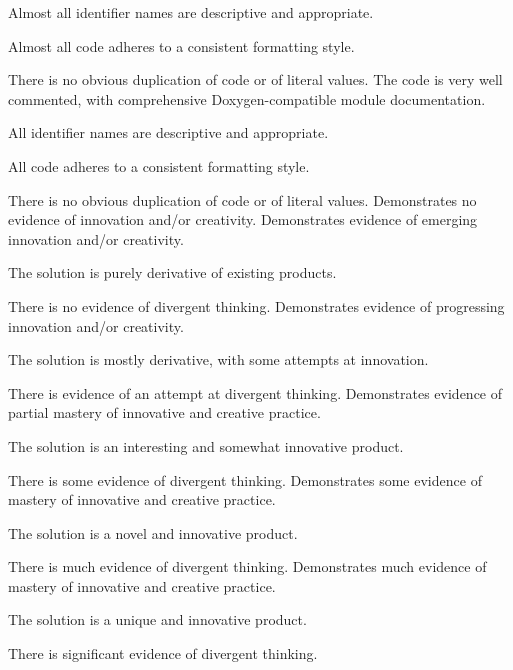 \documentclass{../fal_assignment}
\begin{document}
\begin{markingrubric}
            \par Almost all identifier names are descriptive and appropriate.
            \par Almost all code adheres to a consistent formatting style.
             \par There is no obvious duplication of code or of literal values. %
        \grade The code is very well commented, with comprehensive Doxygen-compatible module documentation.
            \par All identifier names are descriptive and appropriate.
            \par All code adheres to a consistent formatting style.
             \par There is no obvious duplication of code or of literal values. %
%
        \grade\fail Demonstrates no evidence of innovation and/or creativity.
        \grade Demonstrates evidence of emerging innovation and/or creativity.
            \par The solution is purely derivative of existing products.
            \par There is no evidence of divergent thinking.
        \grade Demonstrates evidence of progressing innovation and/or creativity.
            \par The solution is mostly derivative, with some attempts at innovation.
            \par There is evidence of an attempt at divergent thinking.
        \grade Demonstrates evidence of partial mastery of innovative and creative practice.
            \par The solution is an interesting and somewhat innovative product.
            \par There is some evidence of divergent thinking.
        \grade Demonstrates some evidence of mastery of innovative and creative practice.
            \par The solution is a novel and innovative product.
            \par There is much evidence of divergent thinking.
        \grade Demonstrates much evidence of mastery of innovative and creative practice.
            \par The solution is a unique and innovative product.
            \par There is significant evidence of divergent thinking.

\end{markingrubric}
\end{document}
